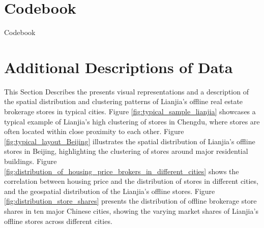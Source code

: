 \documentclass[11pt]{article}
\begin{document}


\newpage
\appendix
\setcounter{table}{0}
\renewcommand{\tablename}{Appendix Table}
\renewcommand{\figurename}{Appendix Figure}
\renewcommand{\thetable}{\thesection. \arabic{table}}
\setcounter{figure}{0}
\renewcommand{\thefigure}{\thesection. \arabic{figure}}

\section{Codebook} \label{sec:codebook}

\begin{table}[H]
  \begin{center}
    \begin{scriptsize}
    \caption{Codebook}
    \label{tab:codebook}
      
  
    \end{scriptsize}
  \end{center}
\end{table}


\section{Additional Descriptions of Data} \label{sec:appendix_data}

This Section Describes the presents visual representations and a description of the spatial distribution and clustering patterns of Lianjia's offline real estate brokerage stores in typical cities. Figure \ref{fig:typical_sample_lianjia} showcases a typical example of Lianjia's high clustering of stores in Chengdu, where stores are often located within close proximity to each other. Figure \ref{fig:typical_layout_Beijing} illustrates the spatial distribution of Lianjia's offline stores in Beijing, highlighting the clustering of stores around major residential buildings. Figure \ref{fig:distribution_of_housing_price_brokers_in_different_cities} shows the correlation between housing price and the distribution of stores in different cities, and the geospatial distribution of the Lianjia's offline stores. Figure \ref{fig:distribution_store_shares} presents the distribution of offline brokerage store shares in ten major Chinese cities, showing the varying market shares of Lianjia's offline stores across different cities.
\end{document}
